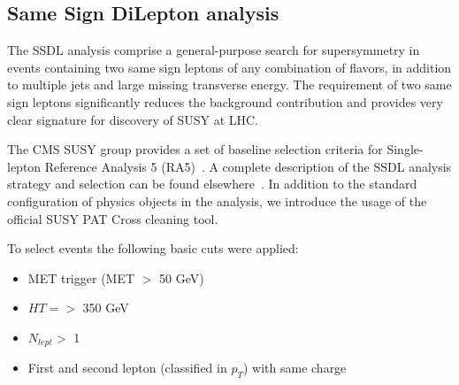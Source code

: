 
\subsection{Same Sign DiLepton analysis}
The SSDL analysis comprise a general-purpose search for supersymmetry in events containing two same sign
leptons of any combination of flavors,
in addition to multiple jets and large missing transverse energy. The requirement of two same sign
leptons significantly reduces the background contribution and provides very clear signature for discovery of SUSY
at LHC.

The CMS SUSY group provides a set of baseline selection criteria for Single-lepton Reference Analysis 5 (RA5)~\cite{RA5page}.  A complete description of the SSDL analysis strategy and
selection can be found elsewhere~\cite{ssdlnote}.
In addition to the standard configuration of physics objects in the analysis, we introduce the usage of the official SUSY PAT Cross cleaning tool.


To select events the following basic cuts were applied:
\begin{itemize}
\item MET trigger (MET $>$ 50 GeV)
\item $HT= >$ 350 GeV
\item $N_{lept} >$ 1
\item First and second lepton (classified in $p_T$) with same charge
\end{itemize}

